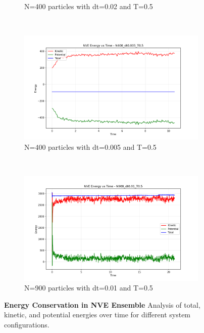\begin{figure}[H]
\begin{subfigure}{0.5\textwidth}
		\caption{N=400 particles with dt=0.02 and T=0.5}
		\label{sfig:energy_N400_dt002}
	\end{subfigure}%
	\\
	\begin{subfigure}{0.5\textwidth}
		\includegraphics[width=\textwidth]{media/energy_N400_dt0.005_T0.5.png}
		\caption{N=400 particles with dt=0.005 and T=0.5}
		\label{sfig:energy_N400_dt0005}
	\end{subfigure}%
	~
	\begin{subfigure}{0.5\textwidth}
		\includegraphics[width=\textwidth]{media/energy_N900_dt0.01_T0.5.png}
		\caption{N=900 particles with dt=0.01 and T=0.5}
		\label{sfig:energy_N900}
	\end{subfigure}%
	\caption{\textbf{Energy Conservation in NVE Ensemble} 
    Analysis of total, kinetic, and potential energies over time for different system configurations.}
	\label{fig:energy_conservation}
\end{figure}
